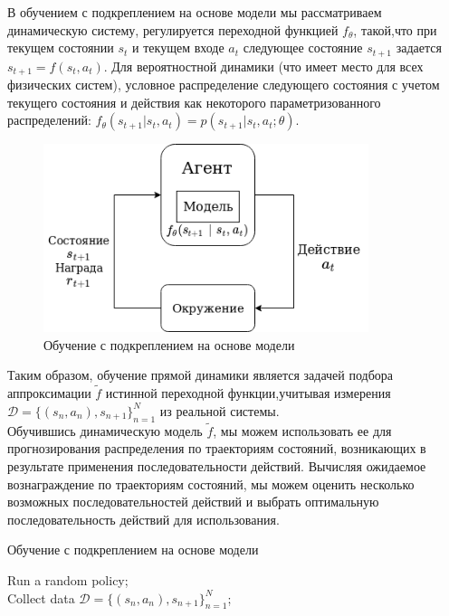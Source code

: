 \documentclass[a4paper,12pt]{article}
\begin{document}
В обучением с подкреплением на основе модели мы рассматриваем динамическую систему, регулируется переходной функцией $f_\theta$, такой,что при текущем состоянии $s_t$ и текущем входе $a_t$ следующее состояние $s_{t+1}$ задается $s_{t+1}=f(s_t, a_t)$. Для вероятностной динамики (что имеет место для всех физических систем), условное распределение следующего состояния с учетом текущего состояния и действия как некоторого параметризованного распределений: $f_\theta(s_{t+1}|s_t , a_t)=p(s_{t+1}|s_t,a_t;\theta)$.\\
\begin{figure}[H]
    \centering
    \includegraphics[height=5.5cm]{img/MBRL_ru.png}
    \caption{Обучение с подкреплением на основе модели}
    \label{fig:my_label}
\end{figure}
Таким образом, обучение прямой динамики является задачей подбора аппроксимации $\tilde{f}$ истинной переходной функции,учитывая измерения $\mathcal{D}=\{(s_n,a_n), s_{n+1}\}_{n=1}^N$ из реальной системы.\\

Обучившись динамическую модель $\tilde{f}$, мы можем использовать ее для прогнозирования распределения по траекториям состояний, возникающих в результате применения последовательности действий. Вычисляя ожидаемое вознаграждение по траекториям состояний, мы можем оценить несколько возможных последовательностей действий и выбрать оптимальную последовательность действий для использования.\\

\begin{algorithm}[H]
\SetAlgoLined
\DontPrintSemicolon
\caption{Обучение с подкреплением на основе модели}
Run a random policy;\\
Collect data $\mathcal{D}=\{(s_n,a_n), s_{n+1}\}_{n=1}^N$;\\
\end{algorithm}
\end{document}
